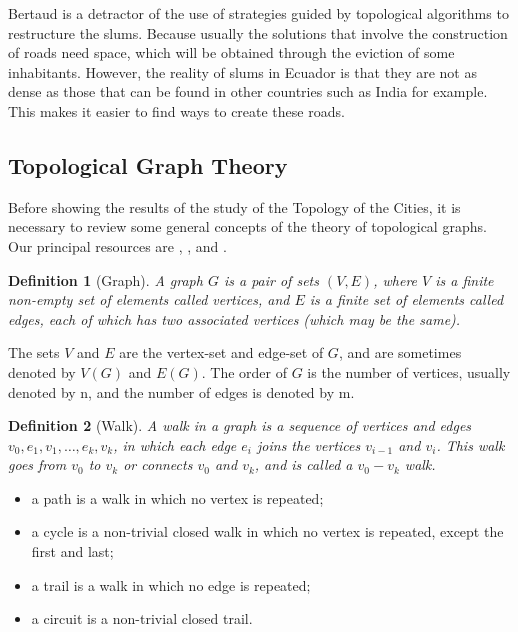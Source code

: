 \documentclass[10pt]{article}
\newtheorem{definition}{Definition}
\begin{document}
Bertaud is a detractor of the use of strategies guided by topological algorithms to restructure the slums. Because usually the solutions that involve the construction of roads need space, which will be obtained through the eviction of some inhabitants\cite{Ornes9686}. However, the reality of slums in Ecuador is that they are not as dense as those that can be found in other countries such as India for example. This makes it easier to find ways to create these roads. 

\subsection{Topological Graph Theory}
Before showing the results of the study of the Topology of the Cities, it is necessary to review some general concepts of the theory of topological graphs. Our principal resources are \cite{gross2009topics}, \cite{bonnington2012foundations}, \cite{gross1987topological} and \cite{richeson2008euler}.\\

\begin{definition}[Graph]
A graph $G$ is a pair of sets $(V , E)$, where $V$ is a finite non-empty set of elements called vertices, and $E$ is a finite set of elements called edges, each of which has two associated vertices (which may be the same).
\end{definition}

The sets $V$ and $E$ are the vertex-set and edge-set of $G$, and are sometimes denoted by $V(G)$ and $E(G)$. The order of $G$ is the number of vertices, usually denoted by n, and the number of edges is denoted by m.

\begin{definition}[Walk]
A walk in a graph is a sequence of vertices and edges $v_0, e_1, v_1, \dots, e_k, v_k$, in which each edge $e_i$ joins the vertices $v_{i-1}$ and $v_i$. This walk goes from $v_0$ to $v_k$ or connects $v_0$ and $v_k$, and is called a $v_0-v_k$ walk.
\end{definition}

\begin{itemize}
    \item a path is a walk in which no vertex is repeated;
    \item a cycle is a non-trivial closed walk in which no vertex is repeated, except the first and last;
    \item a trail is a walk in which no edge is repeated;
    \item a circuit is a non-trivial closed trail.
\end{itemize}
\end{document}
